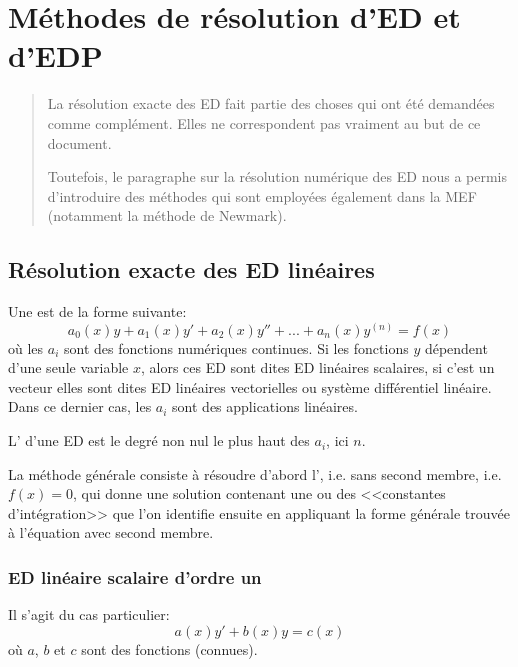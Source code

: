 \chapter{Méthodes de résolution d'ED et d'EDP}\label{Ch-ED}
\begin{abstract}
La résolution exacte des ED fait partie des choses qui ont été demandées comme
complément. Elles ne correspondent pas vraiment au but de ce document.

Toutefois, le paragraphe sur la résolution numérique des ED nous a permis
d'introduire des méthodes qui sont employées également dans la MEF (notamment
la méthode de Newmark).
\end{abstract}

\medskip
\section{Résolution exacte des ED linéaires}

Une  est de la forme suivante:
\begin{equation}
    a_0(x) y + a_1(x) y' + a_2(x) y'' + ... + a_n(x) y^{(n)}= f(x)
\end{equation}
où les $a_i$ sont des fonctions numériques continues.
Si les fonctions $y$ dépendent d'une seule variable $x$, alors ces ED sont dites
ED linéaires scalaires, si c'est un vecteur elles sont dites ED linéaires vectorielles
ou système différentiel linéaire. Dans ce dernier cas, les $a_i$ sont des applications
linéaires.

L' d'une ED est le degré non nul le plus haut des $a_i$, ici $n$.

\medskip
La méthode générale consiste à résoudre d'abord l', 
i.e. sans second membre, i.e. $f(x)=0$, qui donne une solution contenant une ou des <<constantes
d'intégration>> que l'on identifie ensuite en appliquant la forme générale trouvée à
l'équation avec second membre.


\medskip
\subsection{ED linéaire scalaire d'ordre un}

Il s'agit du cas particulier:
\begin{equation}
    a(x)y' + b(x)y = c(x)
\end{equation}
où $a$, $b$ et $c$ sont des fonctions (connues).

